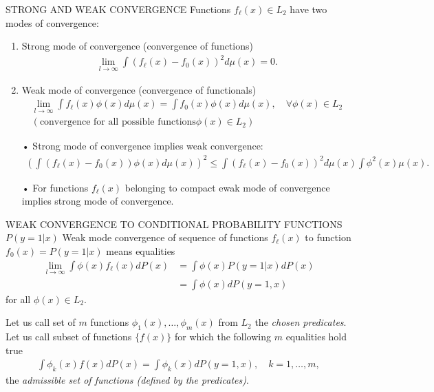 \documentclass[11pt]{beamer}
\begin{document}
\begin{frame}{STRONG AND WEAK CONVERGENCE}
Functions $f_{\ell}(x) \in L_{2}$ have two modes of convergence:
\begin{enumerate}
\item Strong mode of convergence (convergence of functions)
\begin{align*}
\lim_{l \rightarrow \infty} \int (f_{\ell}(x) - f_{0}(x))^{2}d\mu(x) = 0.
\end{align*}
\item Weak mode of convergence (convergence of functionals)
\begin{align*}
\lim_{l \rightarrow \infty} \int f_{\ell}(x)\phi(x)d\mu(x) = \int f_{0}(x)\phi(x)d\mu(x), \quad \forall \phi(x) \in L_{2}\\
(\text{convergence for all possible functions} \phi(x) \in L_{2})
\end{align*} 
\item[•] Strong mode of convergence implies weak convergence:
\begin{align*}
\left( \int (f_{\ell}(x) - f_{0}(x))\phi(x)d\mu(x) \right)^{2} \leq \int (f_{\ell}(x) - f_{0}(x))^{2}d\mu(x) \int \phi^{2}(x)\mu(x).
\end{align*}
\item[•] For functions $f_{\ell}(x)$ belonging to compact ewak mode of convergence implies strong mode of convergence.
\end{enumerate}
\end{frame}

\begin{frame}{WEAK CONVERGENCE TO CONDITIONAL PROBABILITY FUNCTIONS $P(y=1|x)$}
Weak mode convergence of sequence of functions $f_{\ell}(x)$ to function $f_{0}(x) = P(y=1|x)$ means equalities
\begin{align*}
\lim_{l \rightarrow \infty} \int \phi(x)f_{\ell}(x)dP(x) &= \int \phi(x)P(y=1|x)dP(x)\\
&= \int \phi(x)dP(y=1,x)
\end{align*} 
for all $\phi(x) \in L_{2}$.

Let us call set of $m$ functions $\phi_{1}(x), \ldots, \phi_{m}(x)$ from $L_{2}$ the \emph{chosen predicates}. Let us call subset of functions $\{f(x)\}$ for which the following $m$ equalities hold true
\begin{align*}
\int \phi_{k}(x)f(x)dP(x) = \int \phi_{k}(x)dP(y=1, x), \quad k = 1, \ldots, m,
\end{align*}
the \emph{admissible set of functions (defined by the predicates)}.
\end{frame}
\end{document}
